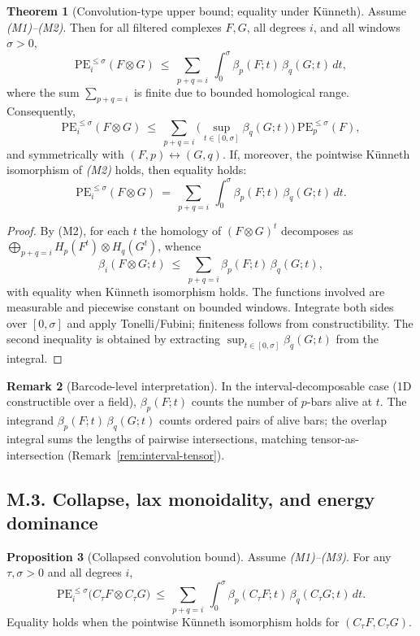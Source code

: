 \documentclass[11pt]{article}
\numberwithin{equation}{section}
\theoremstyle{plain}
\theoremstyle{definition}
\theoremstyle{remark}
\theoremstyle{plain}
\theoremstyle{definition}
\newcommand{\PE}{\mathrm{PE}}
\newcommand{\betti}{\beta}
\newcommand{\CT}{C_{\tau}}
\numberwithin{equation}{section}
\newtheorem{theorem}{Theorem}[section]
\newtheorem{proposition}[theorem]{Proposition}
\theoremstyle{definition}
\newtheorem{remark}[theorem]{Remark}
\numberwithin{equation}{section}
\theoremstyle{plain}
\theoremstyle{definition}
\theoremstyle{remark}
\begin{document}
\begin{theorem}[Convolution-type upper bound; equality under K\"unneth]\label{thm:conv}
Assume \emph{(M1)--(M2)}. Then for all filtered complexes \(F,G\), all degrees \(i\), and all windows \(\sigma>0\),
\[
  \PE_i^{\le \sigma}(F\otimes G)\ \le\ \sum_{p+q=i}\ \int_0^\sigma \betti_p(F;t)\,\betti_q(G;t)\,dt,
\]
where the sum \(\sum_{p+q=i}\) is finite due to bounded homological range. Consequently,
\[
  \PE_i^{\le \sigma}(F\otimes G)\ \le\ \sum_{p+q=i}\Big(\sup_{t\in[0,\sigma]}\betti_q(G;t)\Big)\,\PE_p^{\le \sigma}(F),
\]
and symmetrically with \((F,p)\leftrightarrow(G,q)\).
If, moreover, the pointwise K\"unneth isomorphism of \emph{(M2)} holds, then equality holds:
\[
  \PE_i^{\le \sigma}(F\otimes G)\ =\ \sum_{p+q=i}\ \int_0^\sigma \betti_p(F;t)\,\betti_q(G;t)\,dt.
\]
\end{theorem}

\begin{proof}
By (M2), for each \(t\) the homology of \((F\otimes G)^t\) decomposes as \(\bigoplus_{p+q=i}H_p(F^t)\otimes H_q(G^t)\), whence
\[
  \betti_i(F\otimes G;t)\ \le\ \sum_{p+q=i}\betti_p(F;t)\,\betti_q(G;t),
\]
with equality when K\"unneth isomorphism holds. The functions involved are measurable and piecewise constant on bounded windows. Integrate both sides over \([0,\sigma]\) and apply Tonelli/Fubini; finiteness follows from constructibility. The second inequality is obtained by extracting \(\sup_{t\in[0,\sigma]}\betti_q(G;t)\) from the integral. 
\end{proof}

\begin{remark}[Barcode-level interpretation]
In the interval-decomposable case (1D constructible over a field), \(\betti_p(F;t)\) counts the number of \(p\)-bars alive at \(t\). The integrand \(\betti_p(F;t)\,\betti_q(G;t)\) counts ordered pairs of alive bars; the overlap integral sums the lengths of pairwise intersections, matching tensor-as-intersection (Remark~\ref{rem:interval-tensor}).
\end{remark}

\bigskip

\subsection*{M.3. Collapse, lax monoidality, and energy dominance}

\begin{proposition}[Collapsed convolution bound]\label{prop:collapsed-conv}
Assume \emph{(M1)--(M3)}. For any \(\tau,\sigma>0\) and all degrees \(i\),
\[
  \PE_i^{\le \sigma}\big(\CT F \otimes \CT G\big)\ \le\ \sum_{p+q=i}\ \int_0^\sigma \betti_p(\CT F;t)\,\betti_q(\CT G;t)\,dt.
\]
Equality holds when the pointwise K\"unneth isomorphism holds for \((\CT F,\CT G)\).
\end{proposition}
\end{document}
